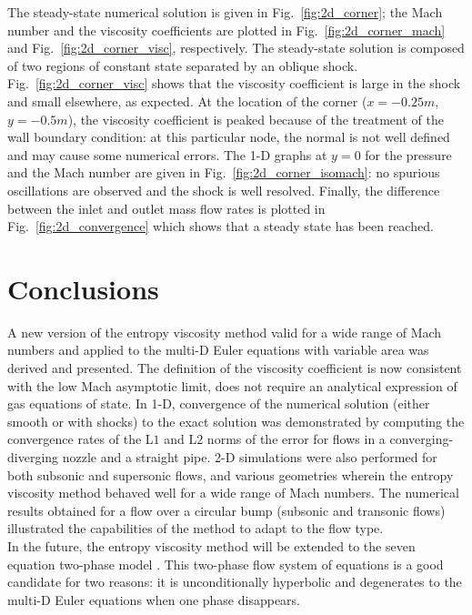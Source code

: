 \documentclass[preprint,10pt]{elsarticle}
\newcommand{\fig}[1]{Fig.~\ref{#1}}                      %
\begin{document}
%
The steady-state numerical solution is given in \fig{fig:2d_corner}; the Mach number and the viscosity coefficients are plotted in \fig{fig:2d_corner_mach} and \fig{fig:2d_corner_visc}, respectively. The steady-state solution is composed of two regions of constant state separated by an oblique shock. \fig{fig:2d_corner_visc} shows that the viscosity coefficient is large in the shock and small elsewhere, as expected. At the location of the corner ($x=-0.25m$, $y=-0.5m$), the viscosity coefficient is peaked because of the treatment of the wall boundary condition: at this particular node, the normal is not well defined and may cause some numerical errors. The 1-D graphs at $y=0$ for the pressure and the Mach number are given in \fig{fig:2d_corner_isomach}: no spurious oscillations are observed and the shock is well resolved. Finally, the difference between the inlet and outlet mass flow rates is plotted in \fig{fig:2d_convergence} which shows that a steady state has been reached. 

\section{Conclusions} \label{sec:ccl}

A new version of the entropy viscosity method valid for a wide range of Mach numbers and applied to the multi-D Euler equations with variable area was derived and presented. The definition of the viscosity coefficient is now consistent with the low Mach asymptotic limit, does not require an analytical expression of gas equations of state. In 1-D, convergence of the numerical solution (either smooth or with shocks) to the exact solution was demonstrated by computing the convergence rates of the L$1$ and L$2$ norms of the error for flows in a converging-diverging nozzle and a straight pipe. 2-D simulations were also performed for both subsonic and supersonic flows, and various geometries wherein the entropy viscosity method behaved well for a wide range of Mach numbers. The numerical results obtained for a flow over a circular bump (subsonic and transonic flows) illustrated the capabilities of the method to adapt to the flow type. \\
In the future, the entropy viscosity method will be extended to the seven equation two-phase model \cite{SEM}. This two-phase flow system of equations is a good candidate for two reasons: it is unconditionally hyperbolic and degenerates to the multi-D Euler equations when one phase disappears.
\end{document}
